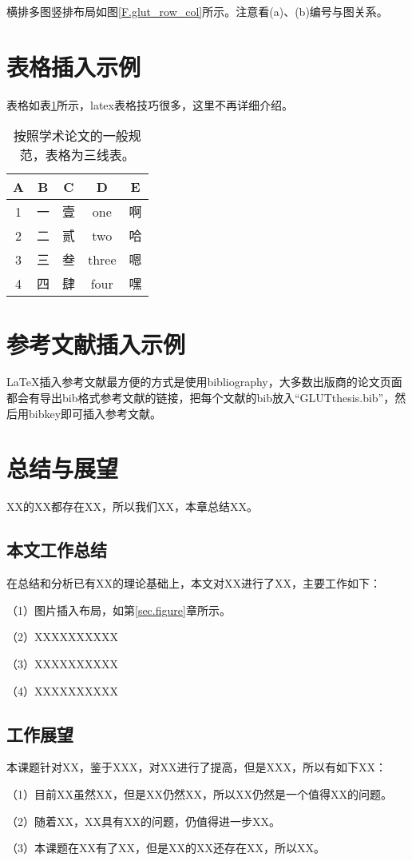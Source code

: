 横排多图竖排布局如图\ref{F.glut_row_col}所示。注意看(a)、(b)编号与图关系。

\newpage

\section{表格插入示例}
表格如表\ref{T.example}所示，latex表格技巧很多，这里不再详细介绍。

\begin{table}[htb]
  \centering
  \caption{按照学术论文的一般规范，表格为三线表。}
  \label{T.example}
  \begin{tabular}{ccccc}
\toprule
A   &  B  &  C  & D  & E \\
\midrule
1 	& 一 & 壹 & one 	 & 啊\\
2 	& 二 & 贰 & two 	 & 哈\\
3 	& 三 & 叁 & three & 嗯\\
4 	& 四 & 肆 & four	 & 嘿\\
\bottomrule
\end{tabular}
\end{table}

\newpage

\section{参考文献插入示例}

LaTeX\cite{lamport1994latex}插入参考文献最方便的方式是使用bibliography\cite{hu2020}，大多数出版商的论文页面\cite{lamport1994latex}都会有导出bib格式参考文献的链接，把每个文献的bib放入``GLUTthesis.bib''，然后用bibkey即可插入参考文献。

\newpage
\section{总结与展望}

XX的XX都存在XX，所以我们XX，本章总结XX。

\subsection{本文工作总结}
在总结和分析已有XX的理论基础上，本文对XX进行了XX，主要工作如下：

（1）图片插入布局，如第\ref{sec.figure}章所示。

（2）XXXXXXXXXX

（3）XXXXXXXXXX

（4）XXXXXXXXXX


\subsection{工作展望}
本课题针对XX，鉴于XXX，对XX进行了提高，但是XXX，所以有如下XX：

（1）目前XX虽然XX，但是XX仍然XX，所以XX仍然是一个值得XX的问题。

（2）随着XX，XX具有XX的问题，仍值得进一步XX。

（3）本课题在XX有了XX，但是XX的XX还存在XX，所以XX。

\newpage
